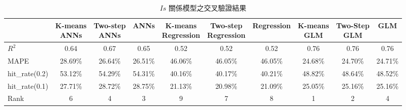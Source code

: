 {\renewcommand{\arraystretch}{1.5}
\begin{table}[hbtp]
  \begin{center}
    \caption{$Is$ 關係模型之交叉驗證結果}
    \label{tab:is_result}
    \scriptsize
    \begin{tabular}{l c c c c c c c c c}
      \hline
       & \specialcell{K-means \\ ANNs} & \specialcell{Two-step \\ ANNs} & ANNs & \specialcell{K-means \\ Regression} & \specialcell{Two-step \\ Regression} & Regression & \specialcell{K-means \\ GLM} & \specialcell{Two-Step \\ GLM} & GLM \\
      \hline
       $R^2$          & 0.64 & 0.67 & 0.65 & 0.52 & 0.52 & 0.52 & 0.76 & 0.76 & 0.76 \\
       MAPE           & 28.69\% & 26.64\% & 26.51\% & 46.06\% & 46.05\% & 46.05\% & 24.68\% & 24.70\% & 24.71\% \\
       hit\_rate(0.2) & 53.12\% & 54.29\% & 54.31\% & 40.16\% & 40.17\% & 40.21\% & 48.82\% & 48.64\% & 48.52\% \\
       hit\_rate(0.1) & 27.71\% & 28.72\% & 28.75\% & 21.13\% & 20.98\% & 21.09\% & 25.05\% & 25.16\% & 25.16\% \\
      \hline
       Rank & 6 & 4 & 3 & 9 & 7 & 8 & 1 & 2 & 4 \\
      \hline
      \end{tabular}
  \end{center}
\end{table}
}

